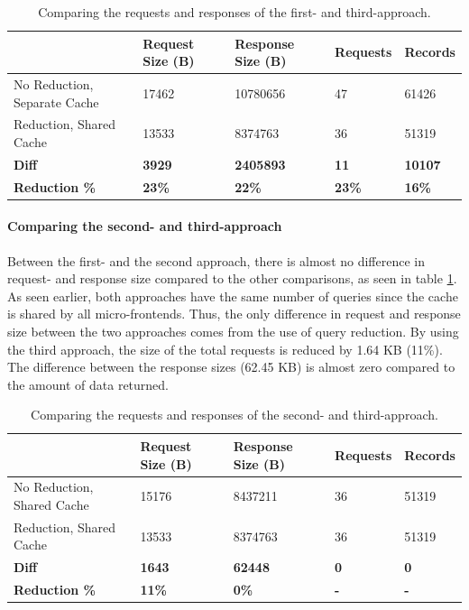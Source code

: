 \ifshowTables
\begin{table}[H]
    \begin{tabular}{|l|l|l|l|l|}
    \hline
       & Request Size (B) & Response Size (B) & Requests & Records  \\
    \hline
     No Reduction, Separate Cache & 17462 & 10780656 & 47 & 61426 \\
     \hline
     Reduction, Shared Cache & 13533 & 8374763 & 36 & 51319 \\
     \hline
     \hline
     \textbf{Diff} & \textbf{3929} & \textbf{2405893} & \textbf{11} & \textbf{10107} \\
     \hline
    \textbf{Reduction \%} & \textbf{23\%} & \textbf{22\%} & \textbf{23\%} & \textbf{16\%} \\
     \hline
    \end{tabular}
    \caption{Comparing the requests and responses of the first- and third-approach.}
    \label{table:results:size-comparison-first-path-no-cache-no-reduction-cache-reduction}
\end{table}
\fi

\paragraph{Comparing the second- and third-approach}

Between the first- and the second approach, there is almost no difference in request- and response size compared to the other comparisons, as seen in table \ref{table:results:size-comparison-first-path-no-cache-no-reduction-cache-reduction}. As seen earlier, both approaches have the same number of queries since the cache is shared by all micro-frontends. Thus, the only difference in request and response size between the two approaches comes from the use of query reduction. By using the third approach, the size of the total requests is reduced by 1.64 KB (11\%). The difference between the response sizes (62.45 KB) is almost zero compared to the amount of data returned.

\ifshowTables
\begin{table}[H]
    \begin{tabular}{|l|l|l|l|l|}
    \hline
      & Request Size (B) & Response Size (B) & Requests & Records \\
    \hline
     No Reduction, Shared Cache & 15176 &  8437211 & 36 & 51319 \\
     \hline
     Reduction, Shared Cache &  13533 &  8374763 & 36 & 51319 \\
     \hline
     \hline
     \textbf{Diff} & \textbf{1643} & \textbf{62448} & \textbf{0} & \textbf{0} \\
     \hline
     \textbf{Reduction \%} & \textbf{11\%} & \textbf{0\%} & \textbf{-} & \textbf{-} \\
     \hline
    \end{tabular}
    \caption{Comparing the requests and responses of the second- and third-approach.}
    \label{table:results:size-comparison-first-path-cache-no-reduction-cache-reduction}
\end{table}
\fi



